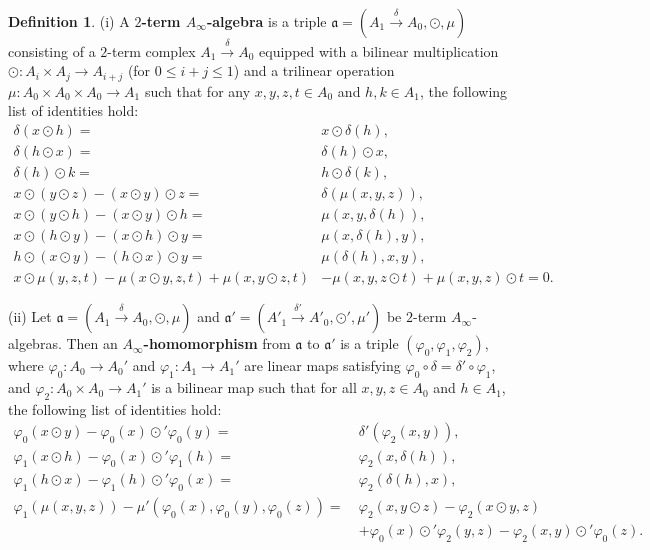 \documentclass[a4paper,reqno,10pt]{amsart}
\theoremstyle{plain}
\theoremstyle{definition}
\newtheorem{defn}[thm]{Definition}
\theoremstyle{remark}
\begin{document}
\begin{defn}\label{defi-2term-ainf}
    (i) A {\bf $2$-term $A_\infty$-algebra} is a triple $\mathfrak{a} = (A_1 \xrightarrow{ \delta } A_0, \odot, \mu)$ consisting of a $2$-term complex $A_1 \xrightarrow{ \delta } A_0$ equipped with a bilinear multiplication $\odot : A_i \times A_j \rightarrow A_{i+j}$ (for $0 \leq i+j \leq 1$) and a trilinear operation $\mu : A_0 \times A_0 \times A_0 \rightarrow A_1$ such that for any $x, y, z, t \in A_0$ and $h, k \in A_1$, the following list of identities hold:
\begin{align}
    \delta (x \odot h) =~& x \odot \delta (h), \tag{A1} \label{a1}\\
    \delta (h \odot x) =~& \delta (h) \odot x, \tag{A2} \label{a2}\\
    \delta (h) \odot k =~& h \odot \delta (k), \tag{A3} \label{a3}\\
    x \odot (y \odot z) - (x \odot y) \odot z =~& \delta (\mu (x, y, z)), \tag{A4} \label{a4}\\
    x \odot (y \odot h) - (x \odot y) \odot h =~& \mu (x, y, \delta (h)), \tag{A5} \label{a5}\\
    x \odot (h \odot y) - (x \odot h) \odot y =~& \mu (x, \delta (h), y), \tag{A6} \label{a6}\\
    h \odot (x \odot y) - (h \odot x) \odot y =~& \mu (\delta (h), x, y), \tag{A7} \label{a7}\\
    x \odot \mu (y, z, t) - \mu (x \odot y, z, t) + \mu (x, y \odot z, t) &- \mu (x, y, z \odot t) + \mu (x, y, z) \odot t = 0. \tag{A8} \label{a8}
\end{align}

    (ii) Let  $\mathfrak{a} = (A_1 \xrightarrow{ \delta } A_0, \odot, \mu)$ and  $\mathfrak{a}' = (A'_1 \xrightarrow{ \delta' } A'_0, \odot', \mu')$ be $2$-term $A_\infty$-algebras. Then an {\bf $A_\infty$-homomorphism} from $\mathfrak{a}$ to $\mathfrak{a}'$ is a triple $(\varphi_0, \varphi_1, \varphi_2)$, where $\varphi_0 : A_0 \rightarrow A_0'$ and $\varphi_1 : A_1 \rightarrow A_1'$ are linear maps satisfying $\varphi_0 \circ \delta = \delta' \circ \varphi_1$, and $\varphi_2 : A_0 \times A_0 \rightarrow A_1'$ is a bilinear map such that for all $x, y, z \in A_0$ and $h \in A_1$, the following list of identities hold:
    \begin{align}
         \varphi_0 (x \odot y) - \varphi_0 (x) \odot' \varphi_0 (y) =~& \delta' (\varphi_2 (x, y)), \\
         \varphi_1 (x \odot h) - \varphi_0 (x) \odot' \varphi_1 (h) =~& \varphi_2 (x, \delta (h)), \\
         \varphi_1 (h \odot x) - \varphi_1 (h) \odot' \varphi_0 (x) =~& \varphi_2 (\delta (h), x), \\
         \varphi_1 (\mu (x, y, z)) - \mu' (\varphi_0 (x), \varphi_0 (y), \varphi_0 (z)) =~& \varphi_2 (x, y \odot z) - \varphi_2 (x \odot y, z) \nonumber \\
         &+ \varphi_0 (x) \odot' \varphi_2 (y, z) - \varphi_2 (x, y)\odot' \varphi_0 (z).
    \end{align}
\end{defn}
\end{document}
